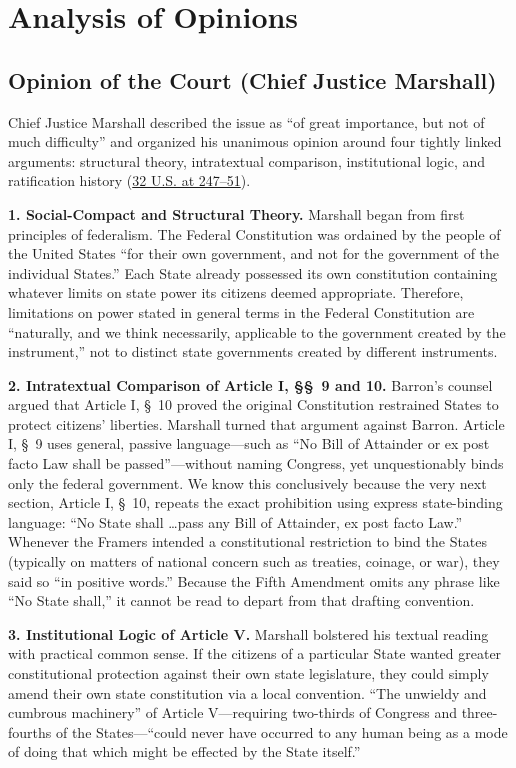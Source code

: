 \documentclass[12pt]{article}
\begin{document}
\section{Analysis of Opinions}

\subsection{Opinion of the Court (Chief Justice Marshall)}

Chief Justice Marshall described the issue as ``of great importance, but not of much difficulty'' and organized his unanimous opinion around four tightly linked arguments: structural theory, intratextual comparison, institutional logic, and ratification history (\href{https://supreme.justia.com/cases/federal/us/32/243/}{32 U.S. at 247--51}).

\textbf{1. Social-Compact and Structural Theory.} Marshall began from first principles of federalism. The Federal Constitution was ordained by the people of the United States ``for their own government, and not for the government of the individual States.'' Each State already possessed its own constitution containing whatever limits on state power its citizens deemed appropriate. Therefore, limitations on power stated in general terms in the Federal Constitution are ``naturally, and we think necessarily, applicable to the government created by the instrument,'' not to distinct state governments created by different instruments.

\textbf{2. Intratextual Comparison of Article I, \S\S~9 and 10.} Barron's counsel argued that Article I, \S~10 proved the original Constitution restrained States to protect citizens' liberties. Marshall turned that argument against Barron. Article I, \S~9 uses general, passive language---such as ``No Bill of Attainder or ex post facto Law shall be passed''---without naming Congress, yet unquestionably binds only the federal government. We know this conclusively because the very next section, Article I, \S~10, repeats the exact prohibition using express state-binding language: ``No State shall \dots pass any Bill of Attainder, ex post facto Law.'' Whenever the Framers intended a constitutional restriction to bind the States (typically on matters of national concern such as treaties, coinage, or war), they said so ``in positive words.'' Because the Fifth Amendment omits any phrase like ``No State shall,'' it cannot be read to depart from that drafting convention.

\textbf{3. Institutional Logic of Article V.} Marshall bolstered his textual reading with practical common sense. If the citizens of a particular State wanted greater constitutional protection against their own state legislature, they could simply amend their own state constitution via a local convention. ``The unwieldy and cumbrous machinery'' of Article V---requiring two-thirds of Congress and three-fourths of the States---``could never have occurred to any human being as a mode of doing that which might be effected by the State itself.''
\end{document}
